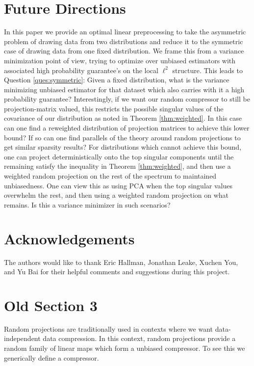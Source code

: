 \documentclass{article}
\theoremstyle{definition}
\theoremstyle{plain}
\begin{document}
\section{Future Directions}
In this paper we provide an optimal linear preprocessing to take the asymmetric problem of drawing data from two distributions and reduce it to the symmetric case of drawing data from one fixed distribution. We frame this from a variance minimization point of view, trying to optimize over unbiased estimators with associated high probability guarantee's on the local $\ell^2$ structure. This leads to Question \ref{ques:symmetric}: Given a fixed distribution, what is the variance minimizing unbiased estimator for that dataset which also carries with it a high probability guarantee? Interestingly, if we want our random compressor to still be projection-matrix valued, this restricts the possible singular values of the covariance of our distribution as noted in Theorem \ref{thm:weighted}. In this case can one find a reweighted distribution of projection matrices to achieve this lower bound? If so can one find parallels of the theory around random projections to get similar sparsity results? For distributions which cannot achieve this bound, one can project deterministically onto the top singular components until the remaining satisfy the inequality in Theorem \ref{thm:weighted}, and then use a weighted random projection on the rest of the spectrum to maintained unbiasedness. One can view this as using PCA when the top singular values overwhelm the rest, and then using a weighted random projection on what remains. Is this a variance minimizer in such scenarios? 

\section*{Acknowledgements}
The authors would like to thank Eric Hallman, Jonathan Leake, Xuchen You, and Yu Bai for their helpful comments and suggestions during this project.




\appendix

\section{Old Section 3}

\newpage

Random projections are traditionally used in contexts where we want data-independent data compression. In this context, random projections provide a random family of linear maps which form a unbiased compressor. To see this we generically define a compressor.
\end{document}
